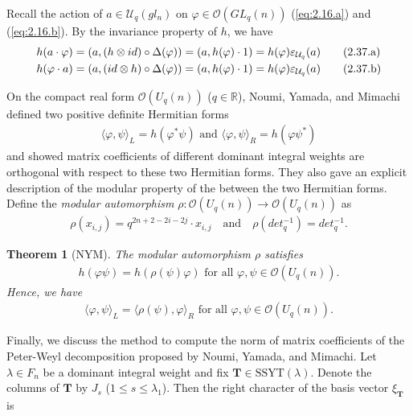 \documentclass[table,a4paper,reqno]{amsart}
\numberwithin{equation}{section}
\newtheorem{theorem}{Theorem}[section]
\theoremstyle{definition}
\begin{document}
Recall the action of $a\in\mathcal{U}_q(gl_n)$ on $\varphi\in\mathcal{O}(GL_q(n))$ (\ref{eq:2.16.a}) and (\ref{eq:2.16.b}). By the invariance property of $h$, we have
\begin{align}\stepcounter{equation}
    h(a\cdot\varphi)&=(a,(h\otimes id)\circ\Delta(\varphi))=(a,h(\varphi)\cdot 1)=h(\varphi)\varepsilon_{\mathcal{U}_q}(a)\tag{2.37.a}\label{eq:2.38}\\
    h(\varphi\cdot a)&=(a,(id\otimes h)\circ\Delta(\varphi))=(a,h(\varphi)\cdot 1)=h(\varphi)\varepsilon_{\mathcal{U}_q}(a)\tag{2.37.b}\label{eq:2.38+}
\end{align}

On the compact real form $\mathcal{O}(U_q(n))$ ($q\in\mathbb{R}$), Noumi, Yamada, and Mimachi defined two positive definite Hermitian forms
\begin{align}
    \langle\varphi,\psi\rangle_L=h(\varphi^*\psi)\text{ and }\langle\varphi,\psi\rangle_R=h(\varphi\psi^*)\label{eq:2.39}
\end{align}
and showed matrix coefficients of different dominant integral weights are orthogonal with respect to these two Hermitian forms. They also gave an explicit description of the modular property of the between the two Hermitian forms. Define the \textit{modular automorphism} $\rho:\mathcal{O}(U_q(n))\rightarrow \mathcal{O}(U_q(n))$ as
\begin{align}
    \rho(x_{i,j})=q^{2n+2-2i-2j}\cdot x_{i,j}\quad\text{and}\quad \rho(det_q^{-1})=det_q^{-1}.\label{eq:2.40}
\end{align}
\begin{theorem}[NYM]\label{thm:2.4}
    The modular automorphism $\rho$ satisfies
    \begin{align}
        h(\varphi\psi)=h(\rho(\psi)\varphi)\text{  for all  }\varphi,\psi\in \mathcal{O}(U_q(n)).\label{eq:2.41}
    \end{align}
    Hence, we have
    \begin{align}
        \langle\varphi,\psi\rangle_L=\langle\rho(\psi),\varphi\rangle_R\text{  for all  }\varphi,\psi\in \mathcal{O}(U_q(n)).\label{eq:2.42}
    \end{align}
\end{theorem}
Finally, we discuss the method to compute the norm of matrix coefficients of the Peter-Weyl decomposition proposed by Noumi, Yamada, and Mimachi. Let $\lambda\in F_n$ be a dominant integral weight and fix $\mathbf{T}\in\text{SSYT}(\lambda)$. Denote the columns of $\mathbf{T}$ by $J_s$ ($1\le s\le \lambda_1$). Then the right character of the basis vector $\xi_{\mathbf{T}}$ is
\end{document}

